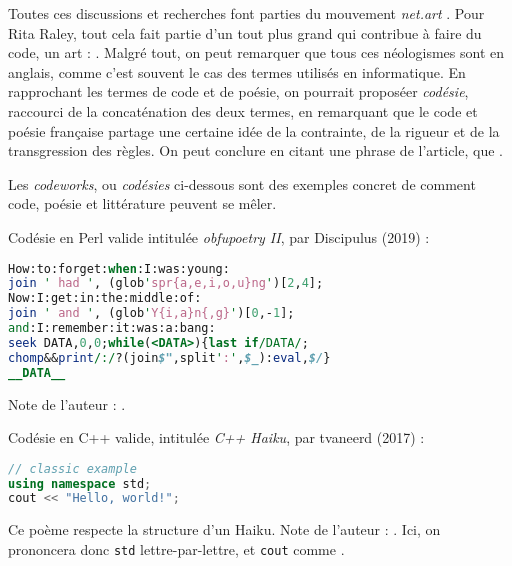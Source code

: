\documentclass[12pt]{article} %
\begin{document}
Toutes ces discussions et recherches font parties du mouvement \textit{net.art} \cite{RRita-codework} \cite{FCramer2001}. Pour Rita Raley, tout cela fait partie d'un tout plus grand qui contribue à faire du code, un art :  \cite{RRita-codework}. Malgré tout, on peut remarquer que tous ces néologismes sont en anglais, comme c'est souvent le cas des termes utilisés en informatique. En rapprochant les termes de code et de poésie, on pourrait proposéer \textit{codésie}, raccourci de la concaténation des deux termes, en remarquant que le code et poésie française partage une certaine idée de la contrainte, de la rigueur et de la transgression des règles. On peut conclure en citant une phrase de l'article, que   \cite{NouvelObs-codepoesie}.

Les \textit{codeworks}, ou \textit{codésies} ci-dessous sont des exemples concret de comment code, poésie et littérature peuvent se mêler.

Codésie en Perl valide intitulée \textit{obfupoetry II}, par Discipulus (2019) :
\begin{lstlisting}[language=Perl, caption={}, label={codework:obfupoetry}]
How:to:forget:when:I:was:young:
join ' had ', (glob'spr{a,e,i,o,u}ng')[2,4];
Now:I:get:in:the:middle:of:
join ' and ', (glob'Y{i,a}n{,g}')[0,-1];
and:I:remember:it:was:a:bang:
seek DATA,0,0;while(<DATA>){last if/DATA/;
chomp&&print/:/?(join$",split':',$_):eval,$/}
__DATA__
\end{lstlisting}
Note de l'auteur :  \cite{codework-obfupoetryII}.

Codésie en C++ valide, intitulée \textit{C++ Haiku}, par tvaneerd (2017) :
\begin{lstlisting}[language=C++, caption={}, label={codework:cpp-poem-haiku}]
// classic example
using namespace std;
cout << "Hello, world!";
\end{lstlisting}
Ce poème respecte la structure d'un Haiku. Note de l'auteur : . Ici, on prononcera donc \verb|std| lettre-par-lettre, et \verb|cout| comme  \cite{reddit-cpp-poem}.
\end{document}
